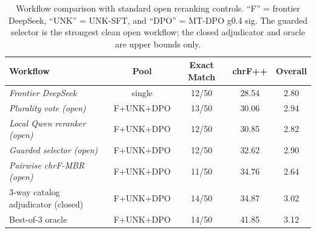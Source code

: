 \begin{table}[t]
\centering
\small
\begin{tabular}{lcccc}
\toprule
Workflow & Pool & Exact Match & chrF++ & Overall \\
\midrule
\textit{Frontier DeepSeek} & single & 12/50 & 28.54 & 2.80 \\
\textit{Plurality vote (open)} & F+UNK+DPO & 13/50 & 30.06 & 2.94 \\
\textit{Local Qwen reranker (open)} & F+UNK+DPO & 12/50 & 30.85 & 2.82 \\
\textit{Guarded selector (open)} & F+UNK+DPO & 12/50 & 32.62 & 2.90 \\
\textit{Pairwise chrF-MBR (open)} & F+UNK+DPO & 11/50 & 34.76 & 2.64 \\
3-way catalog adjudicator (closed) & F+UNK+DPO & 14/50 & 34.87 & 3.02 \\
Best-of-3 oracle & F+UNK+DPO & 14/50 & 41.85 & 3.12 \\
\bottomrule
\end{tabular}
\caption{Workflow comparison with standard open reranking controls. ``F'' = frontier DeepSeek, ``UNK'' = UNK-SFT, and ``DPO'' = MT-DPO g0.4 sig. The guarded selector is the strongest clean open workflow; the closed adjudicator and oracle are upper bounds only.}
\label{tab:oracle-complementarity}
\end{table}
